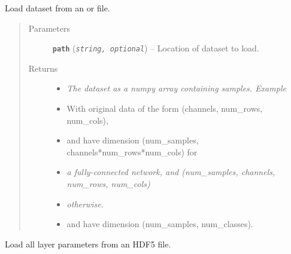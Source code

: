 \documentclass[letterpaper,10pt,english]{sphinxmanual}
\begin{document}
\begin{fulllineitems}
\label{snntoolbox.io_utils:snntoolbox.io_utils.common.load_dataset}
Load dataset from an  or  file.
\begin{quote}\begin{description}
\item[{Parameters}] \leavevmode
\textbf{\texttt{path}} (\emph{\texttt{string, optional}}) -- Location of dataset to load.

\item[{Returns}] \leavevmode
\begin{itemize}
\item {} 
\emph{The dataset as a numpy array containing samples. Example}

\item {} 
With original data of the form (channels, num\_rows, num\_cols), 

\item {} 
and  have dimension (num\_samples, channels*num\_rows*num\_cols) for

\item {} 
\emph{a fully-connected network, and (num\_samples, channels, num\_rows, num\_cols)}

\item {} 
\emph{otherwise.}

\item {} 
 and  have dimension (num\_samples, num\_classes).

\end{itemize}


\end{description}\end{quote}

\end{fulllineitems}


\begin{fulllineitems}
\label{snntoolbox.io_utils:snntoolbox.io_utils.common.load_parameters}
Load all layer parameters from an HDF5 file.

\end{fulllineitems}
\end{document}
